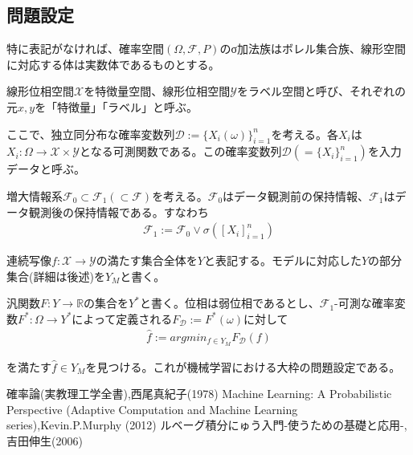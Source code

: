 \documentclass{jsarticle}
\begin{document}
\subsection{問題設定}
特に表記がなければ、確率空間$(\Omega,\mathcal{F},P)$のσ加法族はボレル集合族、線形空間に対応する体は実数体であるものとする。

線形位相空間$\mathcal{X}$を特徴量空間、線形位相空間$\mathcal{Y}$をラベル空間と呼び、それぞれの元$x,y$を「特徴量」「ラベル」と呼ぶ。

ここで、独立同分布な確率変数列$\mathcal{D}:=\{X_i(\omega)\}_{i=1}^n$を考える。各$X_i$は$X_i:\Omega\rightarrow\mathcal{X}\times\mathcal{Y}$となる可測関数である。この確率変数列$\mathcal{D}(=\{X_i\}_{i=1}^n)$を入力データと呼ぶ。

増大情報系$\mathcal{F}_0\subset\mathcal{F}_1(\subset\mathcal{F})$を考える。$\mathcal{F}_0$はデータ観測前の保持情報、$\mathcal{F}_1$はデータ観測後の保持情報である。すなわち
\begin{align}
\mathcal{F}_1:=\mathcal{F}_0\vee\sigma([X_i]^n_{i=1})
\end{align}

連続写像$f:\mathcal{X}\rightarrow\mathcal{Y}$の満たす集合全体を$Y$と表記する。モデルに対応した$Y$の部分集合(詳細は後述)を$Y_M$と書く。

汎関数$F:Y\rightarrow\mathbb{R}$の集合を$Y^*$と書く。位相は弱位相であるとし、$\mathcal{F}_1$-可測な確率変数$F^*:\Omega\rightarrow Y^*$によって定義される$F_\mathcal{D}:=F^*(\omega)$に対して
\begin{align}
\hat{f}:=argmin_{f\in Y_M}F_\mathcal{D}(f)
\end{align}

を満たす$\hat{f}\in Y_M$を見つける。これが機械学習における大枠の問題設定である。



\newpage
\begin{thebibliography}{99}
   確率論(実教理工学全書),西尾真紀子(1978)
   Machine Learning: A Probabilistic Perspective (Adaptive Computation and Machine Learning series),Kevin.P.Murphy (2012)
   ルベーグ積分にゅう入門-使うための基礎と応用-,吉田伸生(2006)
\end{thebibliography}
\end{document}
